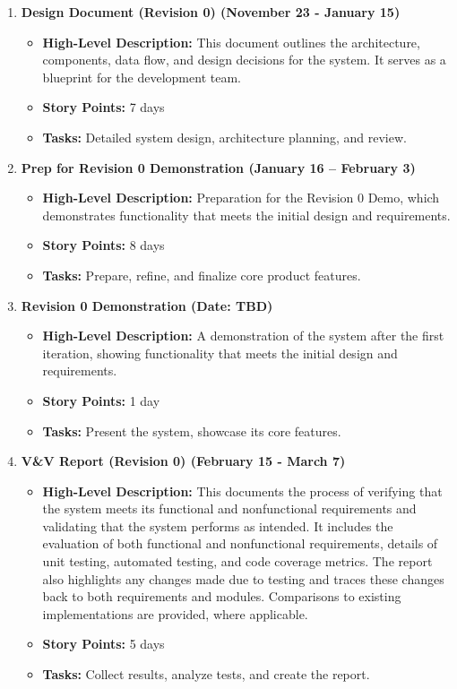 \documentclass[12pt]{article}
\begin{document}
\begin{enumerate}
    \item \textbf{Design Document (Revision 0) (November 23 - January 15)}
    \begin{itemize}
        \item \textbf{High-Level Description:} This document outlines the architecture, components, data flow, and design decisions for the system. 
        It serves as a blueprint for the development team.
        \item \textbf{Story Points:} 7 days
        \item \textbf{Tasks:} Detailed system design, architecture planning, and review.
    \end{itemize}

    \item \textbf{Prep for Revision 0 Demonstration (January 16 – February 3)}
    \begin{itemize}
        \item \textbf{High-Level Description:} Preparation for the Revision 0 Demo, which demonstrates functionality that meets the initial design and requirements.
        \item \textbf{Story Points:} 8 days
        \item \textbf{Tasks:} Prepare, refine, and finalize core product features.
    \end{itemize}

    \item \textbf{Revision 0 Demonstration (Date: TBD)}
    \begin{itemize}
        \item \textbf{High-Level Description:} A demonstration of the system after the first iteration, showing functionality that meets the initial design and requirements.
        \item \textbf{Story Points:} 1 day
        \item \textbf{Tasks:} Present the system, showcase its core features.
    \end{itemize}

    \item \textbf{V\&V Report (Revision 0) (February 15 - March 7)}
    \begin{itemize}
        \item \textbf{High-Level Description:} This documents the process of verifying that the system meets its functional and nonfunctional requirements and validating that 
        the system performs as intended. It includes the evaluation of both functional and nonfunctional requirements, details of unit testing, automated testing, and code 
        coverage metrics. The report also highlights any changes made due to testing and traces these changes back to both requirements and modules. Comparisons to existing 
        implementations are provided, where applicable.
        \item \textbf{Story Points:} 5 days
        \item \textbf{Tasks:} Collect results, analyze tests, and create the report.
    \end{itemize}


\end{enumerate}
\end{document}
